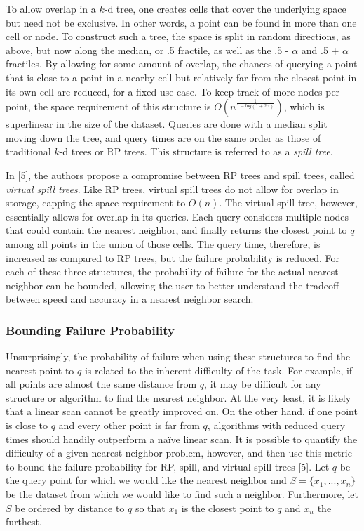 To allow overlap in a $k$-d tree, one creates cells that cover the underlying space but need not be exclusive. In other words, a point can be found in more than one cell or node. To construct such a tree, the space is split in random directions, as above, but now along the median, or .5 fractile, as well as the .5 - $\alpha$ and .5 + $\alpha$ fractiles. By allowing for some amount of overlap, the chances of querying a point that is close to a point in a nearby cell but relatively far from the closest point in its own cell are reduced, for a fixed use case. To keep track of more nodes per point, the space requirement of this structure is 
$O\left(n^{\frac{1}{1-log(1+2\alpha)}}\right)$, which is superlinear in the size of the dataset. Queries are done with a median split moving down the tree, and query times are on the same order as those of traditional $k$-d trees or RP trees. This structure is referred to as a \emph{spill tree}.

In [5], the authors propose a compromise between RP trees and spill trees, called \emph{virtual spill trees}. Like RP trees, virtual spill trees do not allow for overlap in storage, capping the space requirement to $O(n)$. The virtual spill tree, however, essentially allows for overlap in its queries. Each query considers multiple nodes that could contain the nearest neighbor, and finally returns the closest point to $q$ among all points in the union of those cells. The query time, therefore, is increased as compared to RP trees, but the failure probability is reduced. For each of these three structures, the probability of failure for the actual nearest neighbor can be bounded, allowing the user to better understand the tradeoff between speed and accuracy in a nearest neighbor search.

\subsubsection{Bounding Failure Probability}
Unsurprisingly, the probability of failure when using these structures to find the nearest point to $q$ is related to the inherent difficulty of the task. For example, if all points are almost the same distance from $q$, it may be difficult for any structure or algorithm to find the nearest neighbor. At the very least, it is likely that a linear scan cannot be greatly improved on. On the other hand, if one point is close to $q$ and every other point is far from $q$, algorithms with reduced query times should handily outperform a naïve linear scan. It is possible to quantify the difficulty of a given nearest neighbor problem, however, and then use this metric to bound the failure probability for RP, spill, and virtual spill trees [5]. Let $q$ be the query point for which we would like the nearest neighbor and $S=\{x_1,...,x_n\}$ be the dataset from which we would like to find such a neighbor. Furthermore, let $S$ be ordered by distance to $q$ so that $x_1$ is the closest point to $q$ and $x_n$ the furthest.

